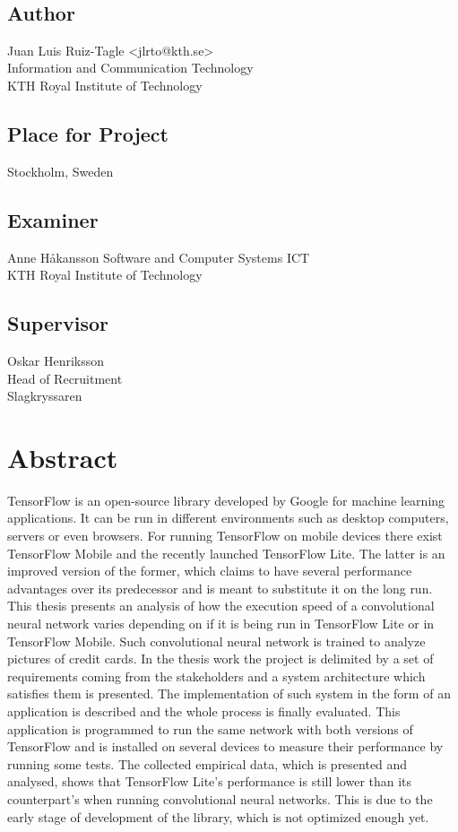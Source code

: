 \newpage
\thispagestyle{empty}
~\\
\vfill
{ 
\subsection*{Author}
Juan Luis Ruiz-Tagle <jlrto@kth.se>\\
Information and Communication Technology\\
KTH Royal Institute of Technology

\subsection*{Place for Project}
Stockholm, Sweden\\

\subsection*{Examiner}
Anne Håkansson
Software and Computer Systems ICT\\
KTH Royal Institute of Technology

\subsection*{Supervisor }
Oskar Henriksson\\
Head of Recruitment\\
Slagkryssaren
~

}

\newpage
\section*{Abstract}
\vspace{2cm}
TensorFlow is an open-source library developed by Google for machine learning applications. It can be run in different environments such as desktop computers, servers or even browsers. For running TensorFlow on mobile devices there exist TensorFlow Mobile and the recently launched TensorFlow Lite. The latter is an improved version of the former, which claims to have several performance advantages over its predecessor and is meant to substitute it on the long run. This thesis presents an analysis of how the execution speed of a convolutional neural network varies depending on if it is being run in TensorFlow Lite or in TensorFlow Mobile. Such convolutional neural network is trained to analyze pictures of credit cards. In the thesis work the project is delimited by a set of requirements coming from the stakeholders and a system architecture which satisfies them is presented. The implementation of such system in the form of an application is described and the whole process is finally evaluated. This application is programmed to run the same network with both versions of TensorFlow and is installed on several devices to measure their performance by running some tests. The collected empirical data, which is presented and analysed, shows that TensorFlow Lite's performance is still lower than its counterpart's when running convolutional neural networks. This is due to the early stage of development of the library, which is not optimized enough yet. 


